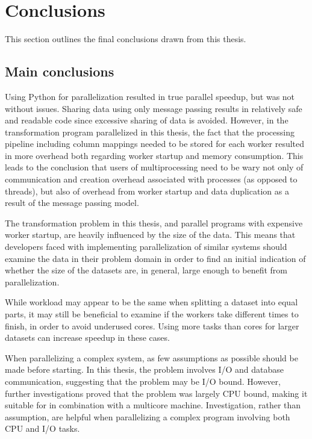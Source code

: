 \section{Conclusions}
This section outlines the final conclusions drawn from this thesis.

\subsection{Main conclusions}
Using Python  for parallelization resulted in true parallel speedup, but was not without issues.
Sharing data using only message passing results in relatively safe and readable code since excessive sharing of data is avoided.
However, in the transformation program parallelized in this thesis, the fact that the processing pipeline including column mappings
needed to be stored for each worker resulted in more overhead both regarding worker startup and memory consumption. This
leads to the conclusion that users of multiprocessing need to be wary not only of communication and creation overhead associated
with processes (as opposed to threads), but also of overhead from worker startup and data duplication as a result of the message
passing model.

The transformation problem in this thesis, and parallel programs with expensive worker startup, are heavily influenced by the size
of the data. This means that developers faced with implementing parallelization of similar systems should examine the data in their
problem domain in order to find an initial indication of whether the size of the datasets are, in general, large enough to benefit
from parallelization.

While workload may appear to be the same when splitting a dataset into equal parts, it may still be beneficial to examine if
the workers take different times to finish, in order to avoid underused cores. Using more tasks than cores for larger datasets
can increase speedup in these cases.

When parallelizing a complex system, as few assumptions as possible should be made before starting. In this thesis, the problem
involves I/O and database communication, suggesting that the problem may be I/O bound. However, further investigations proved that the problem
was largely CPU bound, making it suitable for  in combination with a multicore machine. Investigation, rather than
assumption, are helpful when parallelizing a complex program involving both CPU and I/O tasks.

